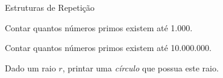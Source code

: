 
\begin{slide}{Estruturas de Repetição}

    \item Contar quantos números primos existem até 1.000.
    
    \item Contar quantos números primos existem até 10.000.000.

    \item Dado um raio $r$, printar uma \textit{círculo} que possua este raio.

\end{slide}